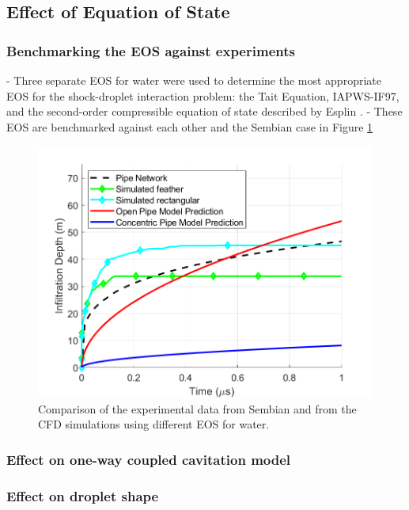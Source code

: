 \documentclass{UCF_ETD}
\begin{document}
\subsection{Effect of Equation of State}

\subsubsection{Benchmarking the EOS against experiments}

- Three separate EOS for water were used to determine the most appropriate EOS for the shock-droplet interaction problem: the Tait Equation, IAPWS-IF97, and the second-order compressible equation of state described by Esplin \cite{Esplin2016}.
- These EOS are benchmarked against each other and the Sembian case \cite{Sembian} in Figure \ref{fig:sembian_benchmark}

\begin{figure}
\centering
\includegraphics[width=\textwidth]{Figures/sembian_benchmark.png}
\caption{Comparison of the experimental data from Sembian \cite{Sembian} and from the CFD simulations using different EOS for water.}
\label{fig:sembian_benchmark}
\end{figure}

\subsubsection{Effect on one-way coupled cavitation model}

\subsubsection{Effect on droplet shape}
\end{document}
